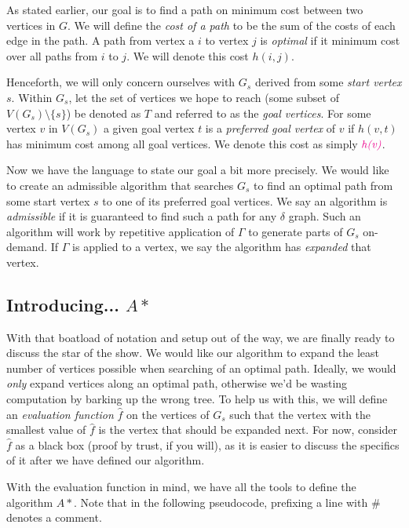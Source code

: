 \documentclass[letterpaper, 10pt]{article}
\newcommand{\keyw}[1]{\textit{\color{magenta}#1}}
\theoremstyle{definition}
\theoremstyle{Algorithm}
\begin{document}
As stated earlier, our goal is to find a path on minimum
cost between two vertices in $G$. We will define the
\keyw{cost of a path} to be the sum of the costs of each edge
in the path. A path from vertex a $i$ to vertex $j$ 
is \keyw{optimal} if it minimum cost over all paths from $i$ to 
$j$. We will denote this cost $h(i,j)$.

Henceforth, we will only concern ourselves with $G_s$ derived
from some \keyw{start vertex} $s$. Within $G_s$, let the set of
vertices we hope to reach (some subset of $V(G_s) \setminus \{s\}$) 
be denoted as $T$ and referred to as
the \keyw{goal vertices}. For some vertex $v$ in $V(G_s)$ 
a given goal vertex $t$ is a \keyw{preferred goal vertex} of
$v$ if $h(v,t)$ has minimum cost among all goal vertices.
We denote this cost as simply $\keyw{h(v)}$.

Now we have the language to state our goal a bit more precisely.
We would like to create an admissible algorithm that searches $G_s$ to
find an optimal path from some start vertex $s$ 
to one of its preferred goal vertices. 
We say an algorithm is \keyw{admissible} if it is guaranteed
to find such a path for any $\delta$ graph.
Such an algorithm will work by repetitive application of 
$\Gamma$ to generate parts of $G_s$ on-demand. If $\Gamma$ is
applied to a vertex, we say the algorithm has \keyw{expanded}
that vertex.


\subsection{Introducing... $A*$} %

With that boatload of notation and setup out of the way,
we are finally ready to discuss the star of the show. 
We would like our algorithm to expand the least number of vertices
possible when searching of an optimal path. Ideally, we would
\emph{only} expand vertices along an optimal path, otherwise we'd
be wasting computation by barking up the wrong tree. To help us
with this, we will define an \keyw{evaluation function} $\hat{f}$
on the vertices of $G_s$ such that the vertex with the smallest 
value of $\hat{f}$ is the vertex that should be expanded next.
For now, consider $\hat{f}$ as a black box (proof by trust, if you
will), as it is easier to discuss the specifics of it after we have
defined our algorithm.

With the evaluation function in mind, we have all the tools to
define the algorithm $A*$. Note that in the following pseudocode,
prefixing a line with \# denotes a comment.
\end{document}
